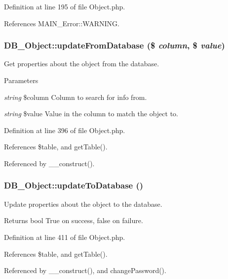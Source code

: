 Definition at line 195 of file Object.php.

References MAIN\_\-Error::WARNING.\hypertarget{classDB__Object_acde3675787ca522413a21203a3957148}{
\subsubsection[{updateFromDatabase}]{\setlength{\rightskip}{0pt plus 5cm}DB\_\-Object::updateFromDatabase (\$ {\em column}, \/  \$ {\em value})}}
\label{dc/d6d/classDB__Object_acde3675787ca522413a21203a3957148}
Get properties about the object from the database.


\begin{DoxyParams}{Parameters}
\item[{\em string}]\$column Column to search for info from. \item[{\em string}]\$value Value in the column to match the object to. \end{DoxyParams}


Definition at line 396 of file Object.php.

References \$table, and getTable().

Referenced by \_\-\_\-construct().\hypertarget{classDB__Object_afd22a626921cf089ccf1977a652d6fc1}{
\subsubsection[{updateToDatabase}]{\setlength{\rightskip}{0pt plus 5cm}DB\_\-Object::updateToDatabase ()}}
\label{dc/d6d/classDB__Object_afd22a626921cf089ccf1977a652d6fc1}
Update properties about the object to the database.

\begin{DoxyReturn}{Returns}
bool True on success, false on failure. 
\end{DoxyReturn}


Definition at line 411 of file Object.php.

References \$table, and getTable().

Referenced by \_\-\_\-construct(), and changePassword().

